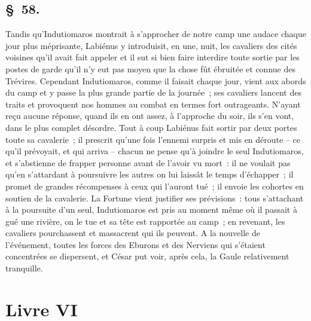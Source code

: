 \documentclass[french,twoside]{book} %
\begin{document}
\subsection[{§ 58.}]{ \textsc{§ 58.} }
\noindent Tandis qu’Indutiomaros montrait à s’approcher de notre camp une audace chaque jour plus méprisante, Labiénus y introduisit, en une, nuit, les cavaliers des cités voisines qu’il avait fait appeler et il sut si bien faire interdire toute sortie par les postes de garde qu’il n’y eut pas moyen que la chose fût ébruitée et connue des Trévires. Cependant Indutiomaros, comme il faisait chaque jour, vient aux abords du camp et y passe la plus grande partie de la journée ; ses cavaliers lancent des traits et provoquent nos hommes au combat en termes fort outrageants. N'ayant reçu aucune réponse, quand ils en ont assez, à l’approche du soir, ils s’en vont, dans le plus complet désordre. Tout à coup Labiénus fait sortir par deux portes toute sa cavalerie ; il prescrit qu’une fois l’ennemi surpris et mis en déroute – ce qu’il prévoyait, et qui arriva – chacun ne pense qu’à joindre le seul Indutiomaros, et s’abstienne de frapper personne avant de l’avoir vu mort : il ne voulait pas qu’en s’attardant à poursuivre les autres on lui laissât le temps d’échapper ; il promet de grandes récompenses à ceux qui l’auront tué ; il envoie les cohortes en soutien de la cavalerie. La Fortune vient justifier ses prévisions : tous s’attachant à la poursuite d’un seul, Indutiomaros est pris au moment même où il passait à gué une rivière, on le tue et sa tête est rapportée au camp ; en revenant, les cavaliers pourchassent et massacrent qui ils peuvent. A la nouvelle de l’événement, toutes les forces des Eburons et des Nerviens qui s’étaient concentrées se dispersent, et César put voir, après cela, la Gaule relativement tranquille.
 \section[{Livre VI}]{Livre VI}\renewcommand{\leftmark}{Livre VI}
\end{document}
